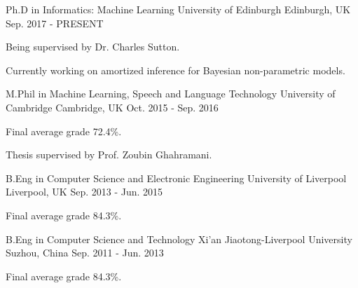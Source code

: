 

\begin{cventries}

  \cventry
    {Ph.D in Informatics: Machine Learning} %
    {University of Edinburgh} %
    {Edinburgh, UK} %
    {Sep. 2017 - PRESENT} %
    {
      \begin{cvitems} %
        \item {Being supervised by Dr. Charles Sutton.}
        \item {Currently working on amortized inference for Bayesian non-parametric models.}
      \end{cvitems}
    }

\cventry
    {M.Phil in Machine Learning, Speech and Language Technology} %
    {University of Cambridge} %
    {Cambridge, UK} %
    {Oct. 2015 - Sep. 2016} %
    {
      \begin{cvitems} %
        \item {Final average grade 72.4\%.}
        \item {Thesis supervised by Prof. Zoubin Ghahramani.}
      \end{cvitems}
    }

\cventry
    {B.Eng in Computer Science and Electronic Engineering} %
    {University of Liverpool} %
    {Liverpool, UK} %
    {Sep. 2013 - Jun. 2015} %
    {
      \begin{cvitems} %
        \item {Final average grade 84.3\%.}
      \end{cvitems}
    }

\cventry
    {B.Eng in Computer Science and Technology} %
    {Xi'an Jiaotong-Liverpool University} %
    {Suzhou, China} %
    {Sep. 2011 - Jun. 2013} %
    {
      \begin{cvitems} %
        \item {Final average grade 84.3\%.}
      \end{cvitems}
    }

\end{cventries}
